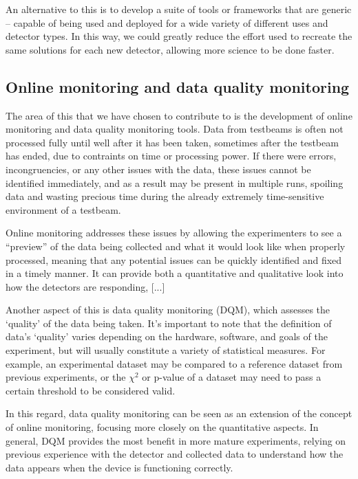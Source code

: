 An alternative to this is to develop a suite of tools or frameworks that are generic -- capable of being used and deployed for a wide variety of different uses and detector types. In this way, we could greatly reduce the effort used to recreate the same solutions for each new detector, allowing more science to be done faster.

\subsection*{Online monitoring and data quality monitoring}
The area of this that we have chosen to contribute to is the development of online monitoring and data quality monitoring tools. Data from testbeams is often not processed fully until well after it has been taken, sometimes after the testbeam has ended, due to contraints on time or processing power. If there were errors, incongruencies, or any other issues with the data, these issues cannot be identified immediately, and as a result may be present in multiple runs, spoiling data and wasting precious time during the already extremely time-sensitive environment of a testbeam.

Online monitoring addresses these issues by allowing the experimenters to see a ``preview'' of the data being collected and what it would look like when properly processed, meaning that any potential issues can be quickly identified and fixed in a timely manner. It can provide both a quantitative and qualitative look into how the detectors are responding, [...] %

Another aspect of this is data quality monitoring (DQM), which assesses the `quality' of the data being taken. It's important to note that the definition of data's `quality' varies depending on the hardware, software, and goals of the experiment, but will usually constitute a variety of statistical measures. For example, an experimental dataset may be compared to a reference dataset from previous experiments, or the $\chi^2$ or p-value of a dataset may need to pass a certain threshold to be considered valid. 

In this regard, data quality monitoring can be seen as an extension of the concept of online monitoring, focusing more closely on the quantitative aspects. In general, DQM provides the most benefit in more mature experiments, relying on previous experience with the detector and collected data to understand how the data appears when the device is functioning correctly.  

